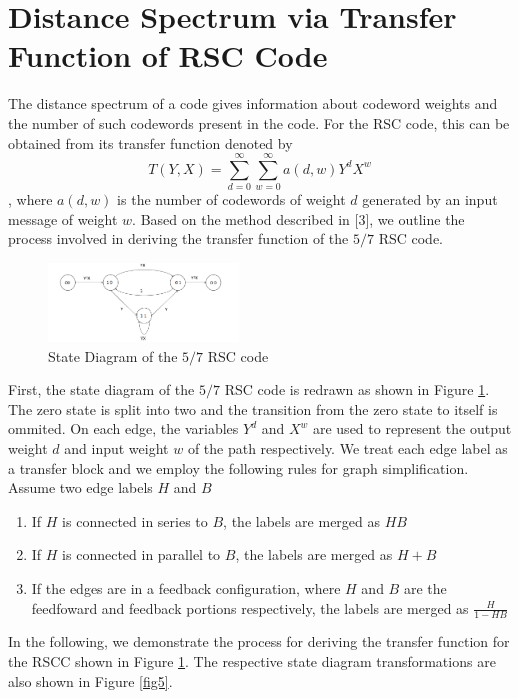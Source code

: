 \section{Distance Spectrum via Transfer Function of RSC Code}
\label{sec3}
The distance spectrum of a code gives information about codeword weights and the number of such codewords present in the code. For the RSC code, this can be obtained from its transfer function denoted by $$T(Y,X)=\sum_{d=0}^{\infty}\sum_{w=0}^{\infty} a(d,w)Y^dX^w$$,  where $a(d,w)$ is the number of codewords of weight $d$ generated by an input message of weight $w$.
Based on the method described in [3], we outline the process involved in deriving the transfer function of the $5/7$ RSC code. 

\begin{figure}[h]
\centering
		\includegraphics[width=0.45\textwidth]{tf.png}
		\caption{State Diagram of the $5/7$ RSC code }
		\label{fig4}
		\end{figure}
First, the state diagram of the $5/7$ RSC code is redrawn as shown in Figure \ref{fig4}. The zero state is split into two and the transition from the zero state to itself is ommited. On each edge, the variables $Y^d$ and $X^w$ are used to represent the output weight $d$ and input weight $w$ of the path respectively. We treat each edge label as a transfer block and we employ the following rules for graph simplification. Assume two edge labels $H$ and $B$ 

\begin{enumerate}
\item If $H$ is connected in series to $B$, the labels are merged as $HB$

\item If $H$ is connected in parallel to $B$, the labels are merged as $H+B$

\item If the edges are in a feedback configuration, where $H$ and $B$ are the feedfoward and feedback portions respectively, the labels are merged as $\frac{H}{1-HB}$
\end{enumerate}

In the following, we demonstrate the process for deriving the transfer function for the RSCC shown in Figure {\ref{fig4}}. The respective state diagram transformations are also shown in Figure {\ref{fig5}}.


